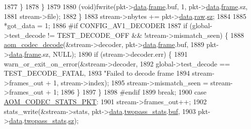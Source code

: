 \begin{DoxyCodeInclude}
{{{{{{{{{{{{{{{{{{{{{{{{{{{{{{{{{{{{{1877             \}
1878           \}
1879 
1880           (void)fwrite(pkt->\hyperlink{structaom__codec__cx__pkt_afb379cd4bfa7692d1d6e85f4e4b2b410}{data}.\hyperlink{structaom__codec__cx__pkt_a4180a6ae59b0d295bc915d4689df4cb0}{frame}.buf, 1, pkt->\hyperlink{structaom__codec__cx__pkt_afb379cd4bfa7692d1d6e85f4e4b2b410}{data}.\hyperlink{structaom__codec__cx__pkt_a4180a6ae59b0d295bc915d4689df4cb0}{frame}.sz,
1881                        stream->file);
1882         \}
1883         stream->nbytes += pkt->\hyperlink{structaom__codec__cx__pkt_afb379cd4bfa7692d1d6e85f4e4b2b410}{data}.\hyperlink{structaom__codec__cx__pkt_a4fc6ea5e240c5df0acbf77aa2fe5ec6f}{raw}.\hyperlink{structaom__fixed__buf_a02f47e8b960c332c60a8aa4b7e37426f}{sz};
1884 
1885         *got\_data = 1;
1886 \textcolor{preprocessor}{#if CONFIG\_AV1\_DECODER}
1887         \textcolor{keywordflow}{if} (global->test\_decode != TEST\_DECODE\_OFF && !stream->mismatch\_seen) \{
1888           \hyperlink{group__decoder_gab03fdb999d1f83a5896869a3ba5f68f7}{aom\_codec\_decode}(&stream->decoder, pkt->\hyperlink{structaom__codec__cx__pkt_afb379cd4bfa7692d1d6e85f4e4b2b410}{data}.\hyperlink{structaom__codec__cx__pkt_a4180a6ae59b0d295bc915d4689df4cb0}{frame}.buf,
1889                            pkt->\hyperlink{structaom__codec__cx__pkt_afb379cd4bfa7692d1d6e85f4e4b2b410}{data}.\hyperlink{structaom__codec__cx__pkt_a4180a6ae59b0d295bc915d4689df4cb0}{frame}.sz, NULL);
1890           \textcolor{keywordflow}{if} (stream->decoder.err) \{
1891             warn\_or\_exit\_on\_error(&stream->decoder,
1892                                   global->test\_decode == TEST\_DECODE\_FATAL,
1893                                   \textcolor{stringliteral}{"Failed to decode frame %
1894                                   stream->frames\_out + 1, stream->index);
1895             stream->mismatch\_seen = stream->frames\_out + 1;
1896           \}
1897         \}
1898 \textcolor{preprocessor}{#endif}
1899         \textcolor{keywordflow}{break};
1900       \textcolor{keywordflow}{case} \hyperlink{group__encoder_ggafeb69da4a9649a54e805f59c26d8dfeda7dcdcb6c401cac64ca98b51f52de8d4b}{AOM\_CODEC\_STATS\_PKT}:
1901         stream->frames\_out++;
1902         stats\_write(&stream->stats, pkt->\hyperlink{structaom__codec__cx__pkt_afb379cd4bfa7692d1d6e85f4e4b2b410}{data}.\hyperlink{structaom__codec__cx__pkt_a40d469839bcd8195c3c8e80db6561dbb}{twopass\_stats}.\hyperlink{structaom__fixed__buf_ac1b22da152c9839329d3780208dffd38}{buf},
1903                     pkt->\hyperlink{structaom__codec__cx__pkt_afb379cd4bfa7692d1d6e85f4e4b2b410}{data}.\hyperlink{structaom__codec__cx__pkt_a40d469839bcd8195c3c8e80db6561dbb}{twopass\_stats}.\hyperlink{structaom__fixed__buf_a02f47e8b960c332c60a8aa4b7e37426f}{sz});
}}}}}}}}}}}}}}}}}}}}}}}}}}}}}}}}}}}}}}
\end{DoxyCodeInclude}
